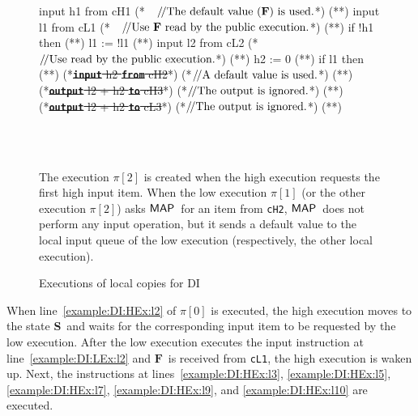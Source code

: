 \documentclass[10pt,a4paper,oneside]{article}
\def\sS{\textbf{S}}
\def\VFALSE{\ensuremath{\textbf{F}}}
\def\sanserif#1{\ensuremath{\sf #1}}
\def\MAP{\ensuremath{\sanserif{MAP}}}
\def\Prog{\ensuremath{\pi}}
\def\Progl#1{\ensuremath{\Prog[#1]}}
\def\ctab{}
\def\icomment#1{\ensuremath{\ctab/\!/\textnormal{#1}}}
\def\figdesc#1{
\noindent
\centering
\begin{minipage}{0.95\columnwidth}
\vspace{3pt}
\begin{footnotesize}
#1
\end{footnotesize}
\end{minipage}
}
\def\linecode#1{{\texttt{#1}}}
\def\linecodeb#1{{\texttt{\bfseries #1}}}
\begin{document}
\begin{figure}[!t]
\subfloat[The low execution \Progl{1}]{\label{fig:example:DI:execution:L}\usebox{\mylistingbox}}\begin{lrbox}{\mylistingbox}\begin{minipage}{\columnwidth}\begin{javascript}
input h1 from cH1 (*~~\icomment{The default value (\VFALSE) is used.}*) (*\label{example:DI:UEx:l1}*)
input l1 from cL1 (*~~\icomment{Use \VFALSE\ read by the public execution.}*) (*\label{example:DI:UEx:l2}*)
if !h1 then      (*\label{example:DI:UEx:l3}*)
    l1 := !l1    (*\label{example:DI:UEx:l4}*)
input l2 from cL2 (*~~\icomment{Use  read by the public execution.}*) (*\label{example:DI:UEx:l5}*)
h2 := 0           (*\label{example:DI:UEx:l6}*)
if l1 then        (*\label{example:DI:UEx:l7}*)
    (*\sout{\linecodeb{input} h2 \linecodeb{from} cH2}*) (*\icomment{A default value is used.}*) (*\label{example:DI:UEx:l8}*)
(*\sout{\linecodeb{output} l2 + h2 \linecodeb{to} cH3}*) (*\icomment{The output is ignored.}*) (*\label{example:DI:UEx:l9}*)    
(*\sout{\linecodeb{output} l2 + h2 \linecodeb{to} cL3}*) (*\icomment{The output is ignored.}*) (*\label{example:DI:UEx:l10}*)  
\end{javascript}\end{minipage}\end{lrbox}  \\
\subfloat[The other execution \Progl{2}]{\label{fig:example:DI:execution:U}\usebox{\mylistingbox}}
\\
\figdesc{The execution \Progl{2} is created when the high execution requests the first high input item. When the low execution \Progl{1} (or the other execution \Progl{2}) asks \MAP\ for an item from \linecode{cH2}, \MAP\ does not perform any input operation, but it sends a default value to the local input queue of the low execution (respectively, the other local execution). }
\caption{Executions of local copies for DI}
\label{fig:example:execution:DI:HLUEx}
\end{figure}


When line~\ref{example:DI:HEx:l2} of \Progl{0} is executed, the high execution moves to the state \sS\ and waits for the corresponding input item to be requested by the low execution. After the low execution executes the input instruction at line~\ref{example:DI:LEx:l2} and \VFALSE\ is received from \linecode{cL1}, the high execution is waken up. Next, the instructions at lines~\ref{example:DI:HEx:l3}, \ref{example:DI:HEx:l5}, \ref{example:DI:HEx:l7}, \ref{example:DI:HEx:l9}, and \ref{example:DI:HEx:l10} are executed.
\end{document}
